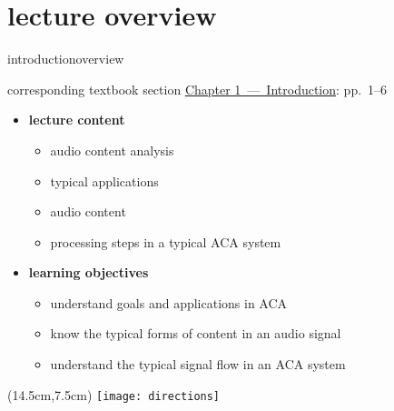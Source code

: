 




\subtitle{Module 1.0: Introduction to MIR/ACA}


	

    \section[overview]{lecture overview}
        \begin{frame}{introduction}{overview}
            \begin{block}{corresponding textbook section}
                    \href{http://ieeexplore.ieee.org/xpl/articleDetails.jsp?tp=&arnumber=6331118&}{Chapter 1~---~Introduction}: pp.~1--6
            \end{block}

            \begin{itemize}
                \item   \textbf{lecture content}
                    \begin{itemize}
                        \item   audio content analysis
                        \item   typical applications
                        \item   audio content
                        \item   processing steps in a typical ACA system
                    \end{itemize}
                \bigskip
                \item<2->   \textbf{learning objectives}
                    \begin{itemize}
                        \item   understand goals and applications in ACA
                        \item   know the typical forms of content in an audio signal
                        \item   understand the typical signal flow in an ACA system
                    \end{itemize}
            \end{itemize}
            \begin{textblock*}{100mm}(14.5cm,7.5cm)
                \texttt{[image: directions]}
            \end{textblock*}
        \end{frame}
        
